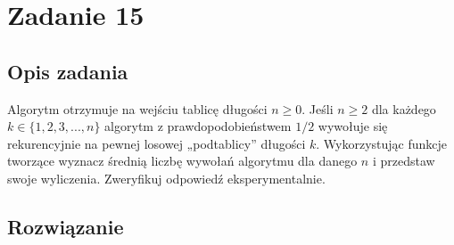 \documentclass{article}
\begin{document}
    \section{Zadanie 15}
    \subsection{Opis zadania}
    Algorytm otrzymuje na wejściu tablicę długości $n \geq 0$. Jeśli $n \geq 2$ dla każdego $k \in \{1,2,3,...,n\}$ algorytm z prawdopodobieństwem 
    $1/2$ wywołuje się rekurencyjnie na pewnej losowej „podtablicy” długości $k$. Wykorzystując funkcje tworzące wyznacz średnią liczbę 
    wywołań algorytmu dla danego $n$ i przedstaw swoje wyliczenia. Zweryfikuj odpowiedź eksperymentalnie.

    
    \subsection{Rozwiązanie}

    
    
\end{document}
